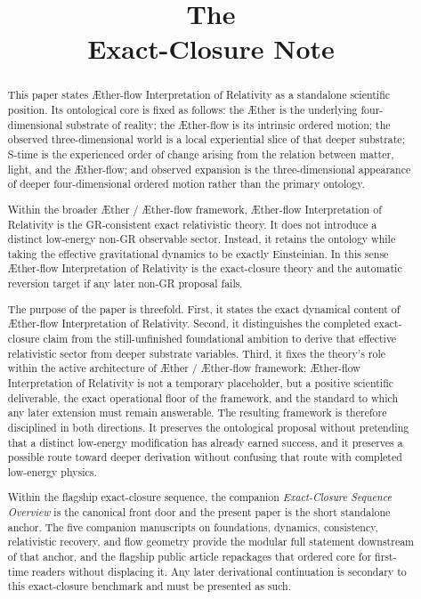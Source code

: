 \documentclass[11pt]{article}
\title{\textbf{The \TheoryName{}}\\[0.4em]
\large Exact-Closure Note}
\author{}
\date{}
\newcommand{\Aether}{\AE{}ther}
\newcommand{\Aflow}{\AE{}ther-flow}
\newcommand{\TheoryName}{\Aflow{} Interpretation of Relativity}
\newcommand{\TheoryProgram}{\Aether{} / \Aflow{} framework}
\begin{document}
\AetherFlowAPATitlePage

\begin{abstract}
This paper states \TheoryName{} as a standalone scientific position. Its ontological core is fixed as follows: the \Aether{} is the underlying four-dimensional substrate of reality; the \Aflow{} is its intrinsic ordered motion; the observed three-dimensional world is a local experiential slice of that deeper substrate; S-time is the experienced order of change arising from the relation between matter, light, and the \Aflow{}; and observed expansion is the three-dimensional appearance of deeper four-dimensional ordered motion rather than the primary ontology.

Within the broader \TheoryProgram{}, \TheoryName{} is the GR-consistent exact relativistic theory. It does not introduce a distinct low-energy non-GR observable sector. Instead, it retains the ontology while taking the effective gravitational dynamics to be exactly Einsteinian. In this sense \TheoryName{} is the exact-closure theory and the automatic reversion target if any later non-GR proposal fails.

The purpose of the paper is threefold. First, it states the exact dynamical content of \TheoryName{}. Second, it distinguishes the completed exact-closure claim from the still-unfinished foundational ambition to derive that effective relativistic sector from deeper substrate variables. Third, it fixes the theory's role within the active architecture of \TheoryProgram{}: \TheoryName{} is not a temporary placeholder, but a positive scientific deliverable, the exact operational floor of the framework, and the standard to which any later extension must remain answerable. The resulting framework is therefore disciplined in both directions. It preserves the ontological proposal without pretending that a distinct low-energy modification has already earned success, and it preserves a possible route toward deeper derivation without confusing that route with completed low-energy physics.

Within the flagship exact-closure sequence, the companion \emph{Exact-Closure Sequence Overview} is the canonical front door and the present paper is the short standalone anchor. The five companion manuscripts on foundations, dynamics, consistency, relativistic recovery, and flow geometry provide the modular full statement downstream of that anchor, and the flagship public article repackages that ordered core for first-time readers without displacing it. Any later derivational continuation is secondary to this exact-closure benchmark and must be presented as such.
\end{abstract}
\end{document}
